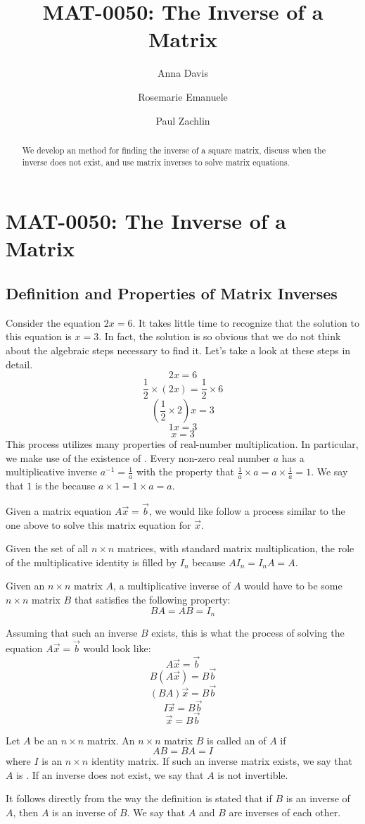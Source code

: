 \documentclass{ximera}
\author{Anna Davis \and Rosemarie Emanuele \and Paul Zachlin} \title{MAT-0050:  The Inverse of a Matrix} \license{CC-BY 4.0}
\begin{document}
\begin{abstract}
 We develop an method for finding the inverse of a square matrix, discuss when the inverse does not exist, and use matrix inverses to solve matrix equations.
\end{abstract}
\maketitle
\section*{MAT-0050:  The Inverse of a Matrix}
\subsection*{Definition and Properties of Matrix Inverses}
Consider the equation $2x=6$.  It takes little time to recognize that the solution to this equation is $x=3$.  In fact, the solution is so obvious that we do not think about the algebraic steps necessary to find it.  Let's take a look at these steps in detail.
$$2x=6$$
$$\frac{1}{2}\times (2x)=\frac{1}{2}\times 6$$
$$(\frac{1}{2}\times 2)x=3$$
$$1x=3$$
$$x=3$$
This process utilizes many properties of real-number multiplication.  In particular, we make use of the existence of .  Every non-zero real number $a$  has a multiplicative inverse $a^{-1}=\frac{1}{a}$ with the property that $\frac{1}{a}\times a=a\times \frac{1}{a}=1$.  We say that $1$ is the  because $a\times 1=1\times a=a$.

Given a matrix equation $A\vec{x}=\vec{b}$, we would like follow a process similar to the one above to solve this matrix equation for $\vec{x}$.  

Given the set of all $n\times n$ matrices, with standard matrix multiplication, the role of the multiplicative identity is filled by $I_n$ because $AI_n=I_nA=A$. 

Given an $n\times n$ matrix $A$, a multiplicative inverse of $A$ would have to be some $n\times n$ matrix $B$ that satisfies the following property:
$$BA=AB=I_n$$

Assuming that such an inverse $B$ exists, this is what the process of solving the equation $A\vec{x}=\vec{b}$ would look like:
$$A\vec{x}=\vec{b}$$
$$B(A\vec{x})=B\vec{b}$$
$$(BA)\vec{x}=B\vec{b}$$
$$I\vec{x}=B\vec{b}$$
$$\vec{x}=B\vec{b}$$

\begin{definition}\label{def:matinverse}
Let $A$ be an $n\times n$ matrix.  An $n\times n$ matrix $B$ is called an  of $A$ if 
$$AB=BA=I$$
where $I$ is an $n\times n$ identity matrix.  If such an inverse matrix exists, we say that $A$ is .  If an inverse does not exist, we say that $A$ is not invertible.
\end{definition}
It follows directly from the way the definition is stated that if $B$ is an inverse of $A$, then $A$ is an inverse of $B$. We say that $A$ and $B$ are inverses of each other.
\end{document}
